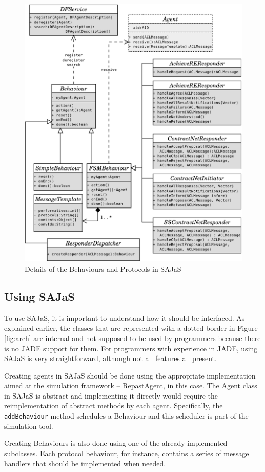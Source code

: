 \begin{figure}
	\centering
	\includegraphics[width=0.7\linewidth]{figures/sajas_arch_proto.pdf}
	\caption[Behaviours and protocols in SAJaS]
	{Details of the Behaviours and Protocols in SAJaS}
	\label{fig:arch_proto}
\end{figure}

\subsection{Using SAJaS}
\label{sec:arch_interface}
To use SAJaS, it is important to understand how it should be interfaced. As explained earlier, the classes that are represented with a dotted border in Figure \ref{fig:arch} are internal and not supposed to be used by programmers because there is no JADE support for them. For programmers with experience in JADE, using SAJaS is very straightforward, although not all features all present.

Creating agents in SAJaS should be done using the appropriate implementation aimed at the simulation framework -- RepastAgent, in this case. The Agent class in SAJaS is abstract and implementing it directly would require the reimplementation of abstract methods by each agent. Specifically, the \texttt{addBehaviour} method schedules a Behaviour and this scheduler is part of the simulation tool.

Creating Behaviours is also done using one of the already implemented subclasses. Each protocol behaviour, for instance, contains a series of message handlers that should be implemented when needed.

